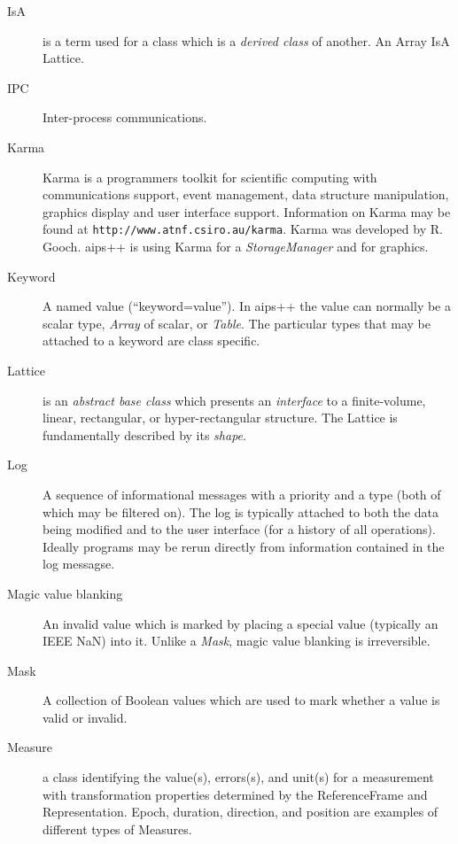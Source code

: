 \begin{description}
\item[IsA] is a term used for a class which is a {\em derived class}
of another. An Array IsA Lattice.


\item[IPC] Inter-process communications.


\item[Karma]
Karma is a programmers toolkit for scientific computing with
communications support, event management, data structure manipulation,
graphics display and user interface support. Information on Karma may
be found at {\tt http://www.atnf.csiro.au/karma}. Karma was developed
by R. Gooch. {\sc aips++} is using Karma for a {\em StorageManager}
and for graphics.

\item[Keyword]
A named value (``keyword=value''). In {\sc aips++} the value can
normally be a scalar type, {\em Array} of scalar, or {\em Table}. The
particular types that may be attached to a keyword are class specific.

\item[Lattice]
is an {\em abstract base class} which presents an {\em interface} to a
finite-volume, linear, rectangular, or hyper-rectangular
structure. The Lattice is fundamentally described by its {\em shape}.



\item[Log]
A sequence of informational messages with a priority and a type (both
of which may be filtered on). The log is typically attached to both
the data being modified and to the user interface (for a history of
all operations). Ideally programs may be rerun directly from
information contained in the log messagse.

\item[Magic value blanking]
An invalid value which is marked by placing a special value (typically
an IEEE NaN) into it. Unlike a {\em Mask}, magic value blanking is
irreversible.

\item[Mask]
A collection of Boolean values which are used to mark whether a value
is valid or invalid.


\item[Measure]
a class identifying the value(s), errors(s), and unit(s) for a
measurement with transformation properties determined by the
ReferenceFrame and Representation.  Epoch, duration, direction, and
position are examples of different types of Measures.


\end{description}
